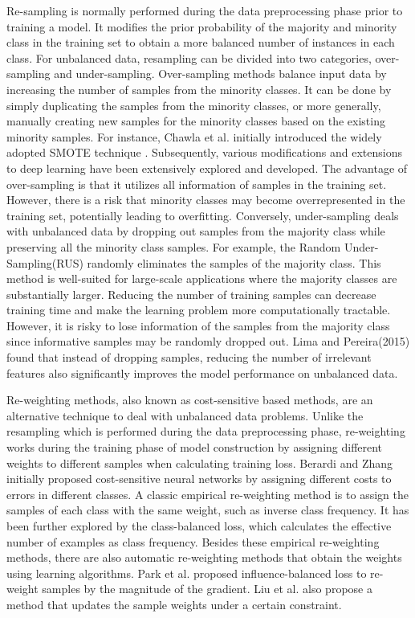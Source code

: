 Re-sampling is normally performed during the data preprocessing phase prior to training a model. It modifies the prior probability of the majority and minority class in the training set to obtain a more balanced number of instances in each class. For unbalanced data, resampling can be divided into two categories, over-sampling and under-sampling. Over-sampling methods balance input data by increasing the number of samples from the minority classes. It can be done by simply duplicating the samples from the minority classes, or more generally, manually creating new samples for the minority classes based on the existing minority samples. For instance, Chawla et al. initially introduced the widely adopted SMOTE technique \cite{Chawla_2002}. Subsequently, various modifications \cite{10.1007/11538059_91} and extensions to deep learning \cite{9694621} have been extensively explored and developed. The advantage of over-sampling is that it utilizes all information of samples in the training set. However, there is a risk that minority classes may become overrepresented in the training set, potentially leading to overfitting. Conversely, under-sampling deals with unbalanced data by dropping out samples from the majority class while preserving all the minority class samples. For example, the Random Under-Sampling(RUS) randomly eliminates the samples of the majority class\cite{tahir2009multiple}. This method is well-suited for large-scale applications where the majority classes are substantially larger. Reducing the number of training samples can decrease training time and make the learning problem more computationally tractable\cite{1549828}. However, it is risky to lose information of the samples from the majority class since informative samples may be randomly dropped out. Lima and Pereira(2015) found that instead of dropping samples, reducing the number of irrelevant features also significantly improves the model performance on unbalanced data\cite{7397461}. 

Re-weighting methods, also known as cost-sensitive based methods, are an alternative technique to deal with unbalanced data problems. Unlike the resampling which is performed during the data preprocessing phase, re-weighting works during the training phase of model construction by assigning different weights to different samples when calculating training loss. Berardi and Zhang initially proposed cost-sensitive neural networks by assigning different costs to errors in different classes\cite{berardi1999effect}. A classic empirical re-weighting method is to assign the samples of each class with the same weight, such as inverse class frequency\cite{Huang_2016_CVPR, NIPS2017_147ebe63}. It has been further explored by the class-balanced loss\cite{cuiClassBalancedLossBased2019}, which calculates the effective number of examples as class frequency. Besides these empirical re-weighting methods, there are also automatic re-weighting methods that obtain the weights using learning algorithms. Park et al. proposed influence-balanced loss to re-weight samples by the magnitude of the gradient\cite{Park_2021_ICCV}. Liu et al. also propose a method that updates the sample weights under a certain constraint\cite{liu2022improving}.

